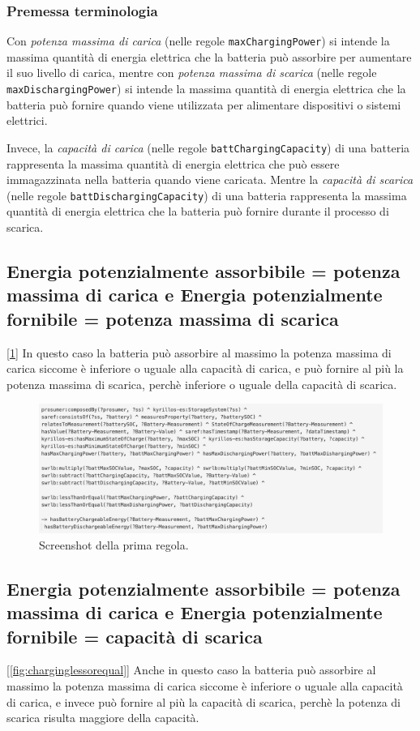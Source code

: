 \subsubsection{Premessa terminologia}
Con \textit{potenza massima di carica} (nelle regole \texttt{maxChargingPower}) si intende la massima quantità di energia elettrica che la batteria può assorbire per aumentare il suo livello di carica,
mentre con \textit{potenza massima di scarica} (nelle regole \texttt{maxDischargingPower}) si intende la massima quantità di energia elettrica che la batteria può fornire quando viene utilizzata per alimentare dispositivi o sistemi elettrici.

Invece, la \textit{capacità di carica} (nelle regole \texttt{battChargingCapacity}) di una batteria rappresenta la massima quantità di energia elettrica che può essere immagazzinata nella batteria quando viene caricata.
Mentre la \textit{capacità di scarica} (nelle regole \texttt{battDischargingCapacity}) di una batteria rappresenta la massima quantità di energia elettrica che la batteria può fornire durante il processo di scarica.


\subsection{Energia potenzialmente assorbibile = potenza massima di carica e Energia potenzialmente fornibile = potenza massima di scarica}
[\ref*{fig:bothlessorequal}] In questo caso la batteria può assorbire al massimo la potenza massima di carica siccome è inferiore o uguale alla capacità di carica,
e può fornire al più la potenza massima di scarica, perchè inferiore o uguale della capacità di scarica.

\begin{figure}[H]
    \centering
    \includegraphics[width=15cm]{images/both <=.png}
    \caption{Screenshot della prima regola.}
    \label{fig:bothlessorequal}
\end{figure}


\subsection{Energia potenzialmente assorbibile = potenza massima di carica e Energia potenzialmente fornibile = capacità di scarica}
[\ref*{fig:charginglessorequal}]  Anche in questo caso la batteria può assorbire al massimo la potenza massima di carica siccome è inferiore o uguale alla capacità di carica,
e invece può fornire al più la capacità di scarica, perchè la potenza di scarica risulta maggiore della capacità.



